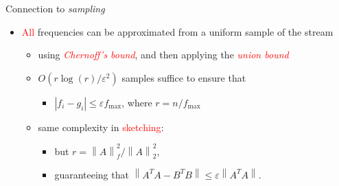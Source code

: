 \documentclass[first=dgreen,second=purple,logo=redque]{aaltoslides}
\newcommand{\vectornorm}[1]{\left\|#1\right\|}
\begin{document}
\begin{frame}[allowframebreaks=1]{Connection to \textit{sampling}}

\begin{itemize}
   \item \textcolor{red}{All} frequencies can be approximated from a
   \textcolor{dgreen}{uniform} sample of the stream
   \begin{itemize}
		\item using \textcolor{red}{\textit{Chernoff's bound}}, and then applying the \textcolor{red}{\textit{union
   bound}}
		\item $O(r\log{(r)}/\varepsilon^{2})$ samples suffice to ensure that
   
		\begin{itemize}
			\item $|f_{i} - g_{i}| \leq \varepsilon f_{\text{max}}$, where $r = n / f_{\text{max}}$
		\end{itemize}
		\item same complexity in \textcolor{red}{sketching}:
		\begin{itemize}
			\item but $r = \vectornorm{A}_{f}^{2} /
				\vectornorm{A}_{2}^{2}$,
			\item guaranteeing that $\vectornorm{A^{T}A - B^{T}B} \leq \varepsilon
				\vectornorm{A^{T}A}$.
		\end{itemize}
	\end{itemize}		
\end{itemize}

\end{frame}


%  	
\end{document}
